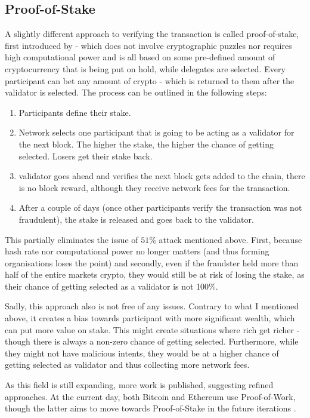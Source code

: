 \subsection{Proof-of-Stake}
A slightly different approach to verifying the transaction is called proof-of-stake, first introduced by \cite{king2012ppcoin} - which does not involve cryptographic puzzles nor requires high computational power and is all based on some pre-defined amount of cryptocurrency that is being put on hold, while delegates are selected. Every participant can bet any amount of crypto - which is returned to them after the validator is selected. The process can be outlined in the following steps:
\begin{enumerate}
    \item Participants define their stake.
    \item Network selects one participant that is going to be acting as a validator for the next block. The higher the stake, the higher the chance of getting selected. Losers get their stake back.
    \item validator goes ahead and verifies the next block gets added to the chain, there is no block reward, although they receive network fees for the transaction.
    \item After a couple of days (once other participants verify the transaction was not fraudulent), the stake is released and goes back to the validator.
\end{enumerate}
This partially eliminates the issue of $51\%$ attack mentioned above. First, because hash rate nor computational power no longer matters (and thus forming organisations loses the point) and secondly, even if the fraudster held more than half of the entire markets crypto, they would still be at risk of losing the stake, as their chance of getting selected as a validator is not 100\%.

Sadly, this approach also is not free of any issues. Contrary to what I mentioned above, it creates a bias towards participant with more significant wealth, which can put more value on stake. This might create situations where rich get richer - though there is always a non-zero chance of getting selected. Furthermore, while they might not have malicious intents, they would be at a higher chance of getting selected as validator and thus collecting more network fees.

As this field is still expanding, more work is published, suggesting refined approaches. At the current day, both Bitcoin and Ethereum use Proof-of-Work, though the latter aims to move towards Proof-of-Stake in the future iterations \cite{saleh2020blockchain}.
